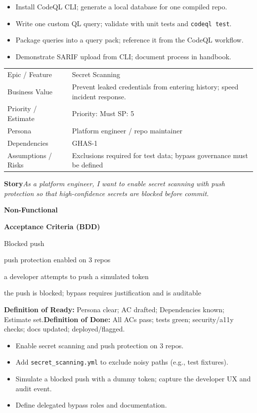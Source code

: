 \documentclass[11pt,a4paper]{article}
\newcommand{\cb}{\(\square\)}
\newenvironment{GHASCard}[2]{%
  \begin{tcolorbox}[ghascard,title={\ghasheader{#1 --- #2}}]
  \small
}{%
  \end{tcolorbox}
}
\newenvironment{GHASTasks}{%
  \begin{tcolorbox}[ghastasks]
  \small
  \begin{itemize}[label=\cb, leftmargin=*, labelsep=0.6em]
}{%
  \end{itemize}
  \end{tcolorbox}
}
\newcommand{\DoR}{\textbf{Definition of Ready:} Persona clear; AC drafted; Dependencies known; Estimate set.}
\newcommand{\DoD}{\textbf{Definition of Done:} All ACs pass; tests green; security/a11y checks; docs updated; deployed/flagged.}
\begin{document}
\begin{GHASTasks}
\item Install CodeQL CLI; generate a local database for one compiled repo.
\item Write one custom QL query; validate with unit tests and \texttt{codeql test}.
\item Package queries into a query pack; reference it from the CodeQL workflow.
\item Demonstrate SARIF upload from CLI; document process in handbook.
\end{GHASTasks}
\clearpage

\begin{GHASCard}{GHAS-4}{Secret Scanning \& Push Protection}
\begin{tabularx}{\linewidth}{L V}
Epic / Feature & Secret Scanning \tabularnewline
Business Value & Prevent leaked credentials from entering history; speed incident response. \tabularnewline
Priority / Estimate & Priority: Must \quad SP: 5 \tabularnewline
Persona & Platform engineer / repo maintainer \tabularnewline
Dependencies & GHAS-1 \tabularnewline
Assumptions / Risks & Exclusions required for test data; bypass governance must be defined \tabularnewline
\end{tabularx}

\medskip
\textbf{Story}\quad \emph{As a platform engineer, I want to enable secret scanning with push protection so that high-confidence secrets are blocked before commit.}

\medskip
\textbf{Non-Functional}\quad
{}\ \ 

\medskip
\textbf{Acceptance Criteria (BDD)}
\begin{description}[leftmargin=2.7cm, labelwidth=2.6cm, style=nextline]
  \item[\textbf{Scenario}] Blocked push
  \item[\textbf{Given}] push protection enabled on 3 repos
  \item[\textbf{When}] a developer attempts to push a simulated token
  \item[\textbf{Then}] the push is blocked; bypass requires justification and is auditable
\end{description}

\medskip
\DoR\quad\textbullet\quad\DoD
\end{GHASCard}

\begin{GHASTasks}
\item Enable secret scanning and push protection on 3 repos.
\item Add \texttt{secret\_scanning.yml} to exclude noisy paths (e.g., test fixtures).
\item Simulate a blocked push with a dummy token; capture the developer UX and audit event.
\item Define delegated bypass roles and documentation.
\end{GHASTasks}
\clearpage
\end{document}
